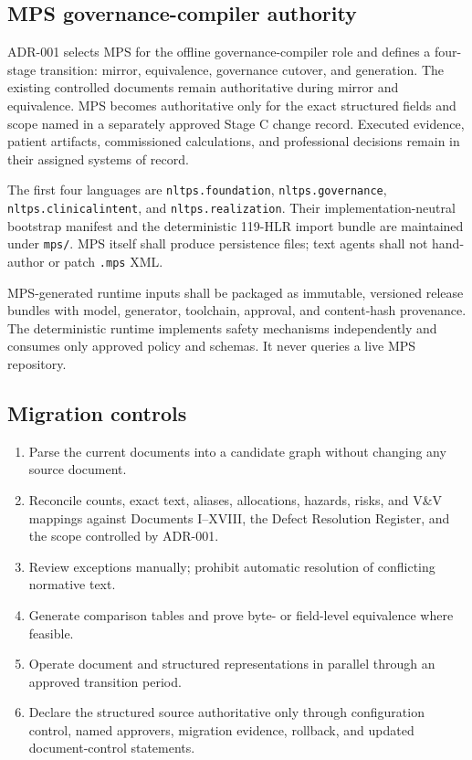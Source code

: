 \documentclass[11pt,letterpaper]{article}
\begin{document}
\subsection{MPS governance-compiler authority}

ADR-001 selects MPS for the offline governance-compiler role and defines a four-stage transition: mirror, equivalence, governance cutover, and generation. The existing controlled documents remain authoritative during mirror and equivalence. MPS becomes authoritative only for the exact structured fields and scope named in a separately approved Stage C change record. Executed evidence, patient artifacts, commissioned calculations, and professional decisions remain in their assigned systems of record.

The first four languages are \texttt{nltps.foundation}, \texttt{nltps.governance}, \texttt{nltps.clinicalintent}, and \texttt{nltps.realization}. Their implementation-neutral bootstrap manifest and the deterministic 119-HLR import bundle are maintained under \texttt{mps/}. MPS itself shall produce persistence files; text agents shall not hand-author or patch \texttt{.mps} XML.

MPS-generated runtime inputs shall be packaged as immutable, versioned release bundles with model, generator, toolchain, approval, and content-hash provenance. The deterministic runtime implements safety mechanisms independently and consumes only approved policy and schemas. It never queries a live MPS repository.

\subsection{Migration controls}

\begin{enumerate}
\item Parse the current documents into a candidate graph without changing any source document.
\item Reconcile counts, exact text, aliases, allocations, hazards, risks, and V\&V mappings against Documents I--XVIII, the Defect Resolution Register, and the scope controlled by ADR-001.
\item Review exceptions manually; prohibit automatic resolution of conflicting normative text.
\item Generate comparison tables and prove byte- or field-level equivalence where feasible.
\item Operate document and structured representations in parallel through an approved transition period.
\item Declare the structured source authoritative only through configuration control, named approvers, migration evidence, rollback, and updated document-control statements.
\end{enumerate}
\end{document}
